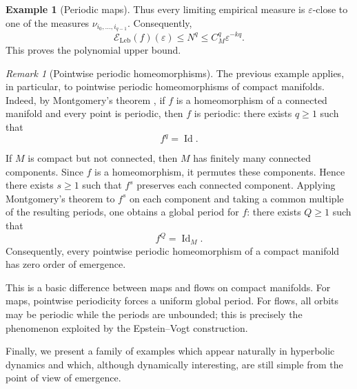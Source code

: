 \documentclass[11pt,reqno]{amsart}
\theoremstyle{plain}
\theoremstyle{definition}
\newtheorem{example}[theorem]{Example}
\theoremstyle{remark}
\newtheorem{rmk}[theorem]{Remark}
\theoremstyle{plain}
\numberwithin{equation}{section}
\newcommand{\Id}{\operatorname{Id}}
\begin{document}
\begin{example}[Periodic maps]
Thus every limiting empirical measure is $\varepsilon$-close to one of the
measures $\nu_{i_0,\dots,i_{q-1}}$. Consequently,
\begin{equation*}
\mathcal E_{\mathrm{Leb}}(f)(\varepsilon)
\leq N^q
\leq C_M^q\varepsilon^{-kq}.
\end{equation*}
This proves the polynomial upper bound.
\end{example}

\begin{rmk}[Pointwise periodic homeomorphisms]\label{rmk:montgomery-pointwise-periodic}
The previous example applies, in particular, to pointwise periodic
homeomorphisms of compact manifolds. Indeed, by Montgomery's theorem
\cite{montgomery}, if $f$ is a homeomorphism of a connected manifold and every
point is periodic, then $f$ is periodic: there exists $q\geq 1$ such that
\begin{equation*}
f^q=\Id.
\end{equation*}

If $M$ is compact but not connected, then $M$ has finitely many connected
components. Since $f$ is a homeomorphism, it permutes these components. Hence
there exists $s\geq 1$ such that $f^s$ preserves each connected component.
Applying Montgomery's theorem to $f^s$ on each component and taking a common
multiple of the resulting periods, one obtains a global period for $f$:
there exists $Q\geq 1$ such that
\begin{equation*}
f^Q=\Id_M.
\end{equation*}
Consequently, every pointwise periodic homeomorphism of a compact manifold has
zero order of emergence.

This is a basic difference between maps and flows on compact manifolds. For
maps, pointwise periodicity forces a uniform global period. For flows, all
orbits may be periodic while the periods are unbounded; this is precisely the
phenomenon exploited by the Epstein--Vogt construction.
\end{rmk}

Finally, we present a family of examples which appear naturally in hyperbolic
dynamics and which, although dynamically interesting, are still simple from the
point of view of emergence.
\end{document}
